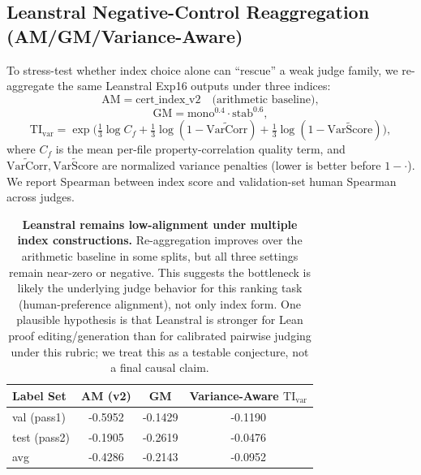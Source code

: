 \documentclass{article}
\begin{document}
\subsection{Leanstral Negative-Control Reaggregation (AM/GM/Variance-Aware)}
To stress-test whether index choice alone can ``rescue'' a weak judge family, we re-aggregate the same Leanstral Exp16 outputs under three indices:
\[
  \mathrm{AM}=\text{cert\_index\_v2} \quad \text{(arithmetic baseline)},
\]
\[
  \mathrm{GM}=\mathrm{mono}^{0.4}\cdot \mathrm{stab}^{0.6},
\]
\[
  \mathrm{TI}_{\mathrm{var}}=\exp\!\Big(\tfrac{1}{3}\log C_f+\tfrac{1}{3}\log(1-\widetilde{\mathrm{VarCorr}})+\tfrac{1}{3}\log(1-\widetilde{\mathrm{VarScore}})\Big),
\]
where \(C_f\) is the mean per-file property-correlation quality term, and \(\widetilde{\mathrm{VarCorr}},\widetilde{\mathrm{VarScore}}\) are normalized variance penalties (lower is better before \(1-\cdot\)).
We report Spearman between index score and validation-set human Spearman across judges.

\begin{table}[t]
  \centering
  \small
  \begin{tabular}{lccc}
    \toprule
    \textbf{Label Set} & \textbf{AM (v2)} & \textbf{GM} & \textbf{Variance-Aware \(\mathrm{TI}_{\mathrm{var}}\)} \\
    \midrule
    val (pass1)        & -0.5952          & -0.1429     & -0.1190                                                \\
    test (pass2)       & -0.1905          & -0.2619     & -0.0476                                                \\
    avg                & -0.4286          & -0.2143     & -0.0952                                                \\
    \bottomrule
  \end{tabular}
  \caption{\textbf{Leanstral remains low-alignment under multiple index constructions.}
    Re-aggregation improves over the arithmetic baseline in some splits, but all three settings remain near-zero or negative.
    This suggests the bottleneck is likely the underlying judge behavior for this ranking task (human-preference alignment), not only index form.
    One plausible hypothesis is that Leanstral is stronger for Lean proof editing/generation than for calibrated pairwise judging under this rubric; we treat this as a testable conjecture, not a final causal claim.}
  \label{tab:app-leanstral-index-reagg}
\end{table}
\end{document}
